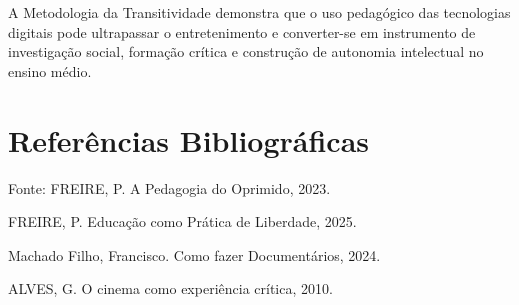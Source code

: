 \documentclass[
  letterpaper,
  DIV=11,
  numbers=noendperiod]{scrreport}
\begin{document}
\begin{tcolorbox}[enhanced jigsaw, arc=.35mm, bottomrule=.15mm, bottomtitle=1mm, breakable, colback=white, colbacktitle=quarto-callout-tip-color!10!white, colframe=quarto-callout-tip-color-frame, coltitle=black, left=2mm, leftrule=.75mm, opacityback=0, opacitybacktitle=0.6, rightrule=.15mm, title=\textcolor{quarto-callout-tip-color}{\faLightbulb}\hspace{0.5em}{Síntese Final}, titlerule=0mm, toprule=.15mm, toptitle=1mm]

A Metodologia da Transitividade demonstra que o uso pedagógico das
tecnologias digitais pode ultrapassar o entretenimento e converter-se em
instrumento de investigação social, formação crítica e construção de
autonomia intelectual no ensino médio.

\end{tcolorbox}


\chapter*{Referências
Bibliográficas}\label{referuxeancias-bibliogruxe1ficas}


Fonte: FREIRE, P. A Pedagogia do Oprimido, 2023.

FREIRE, P. Educação como Prática de Liberdade, 2025.

Machado Filho, Francisco. Como fazer Documentários, 2024.

ALVES, G. O cinema como experiência crítica, 2010.

\protect{}\label{refs}
\end{document}
